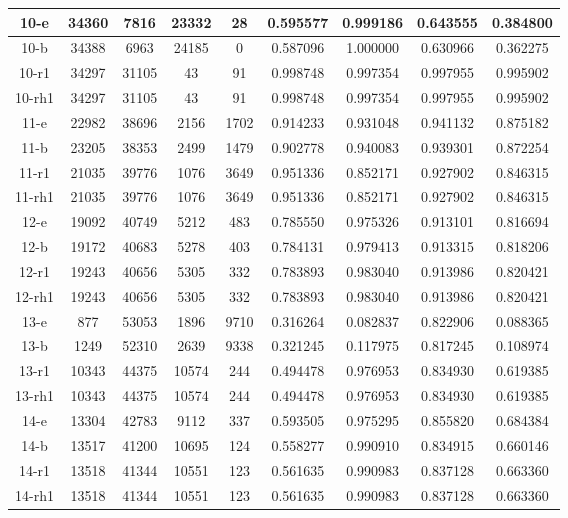 \begin{longtable}[!h]{|c|c|c|c|c|c|c|c|c|}
	\hline	10-e	&	34360	&	7816	&	23332	&	28	&	0.595577	&	0.999186	&	0.643555	&	0.384800	\\
	\hline \rowcolor{bad}	10-b	&	34388	&	6963	&	24185	&	0	&	0.587096	&	1.000000	&	0.630966	&	0.362275	\\
	\hline \rowcolor{closest}	10-r1	&	34297	&	31105	&	43	&	91	&	0.998748	&	0.997354	&	0.997955	&	0.995902	\\
	\hline \rowcolor{closest}	10-rh1	&	34297	&	31105	&	43	&	91	&	0.998748	&	0.997354	&	0.997955	&	0.995902	\\
	
	\hline \rowcolor{closest}	11-e	&	22982	&	38696	&	2156	&	1702	&	0.914233	&	0.931048	&	0.941132	&	0.875182	\\
	\hline	11-b	&	23205	&	38353	&	2499	&	1479	&	0.902778	&	0.940083	&	0.939301	&	0.872254	\\
	\hline \rowcolor{bad}	11-r1	&	21035	&	39776	&	1076	&	3649	&	0.951336	&	0.852171	&	0.927902	&	0.846315	\\
	\hline \rowcolor{bad}	11-rh1	&	21035	&	39776	&	1076	&	3649	&	0.951336	&	0.852171	&	0.927902	&	0.846315	\\
	
	\hline \rowcolor{bad}	12-e	&	19092	&	40749	&	5212	&	483	&	0.785550	&	0.975326	&	0.913101	&	0.816694	\\
	\hline	12-b	&	19172	&	40683	&	5278	&	403	&	0.784131	&	0.979413	&	0.913315	&	0.818206	\\
	\hline \rowcolor{closest}	12-r1	&	19243	&	40656	&	5305	&	332	&	0.783893	&	0.983040	&	0.913986	&	0.820421	\\
	\hline \rowcolor{closest}	12-rh1	&	19243	&	40656	&	5305	&	332	&	0.783893	&	0.983040	&	0.913986	&	0.820421	\\
	
	\hline \rowcolor{bad}	13-e	&	877	&	53053	&	1896	&	9710	&	0.316264	&	0.082837	&	0.822906	&	0.088365	\\
	\hline	13-b	&	1249	&	52310	&	2639	&	9338	&	0.321245	&	0.117975	&	0.817245	&	0.108974	\\
	\hline \rowcolor{closest}	13-r1	&	10343	&	44375	&	10574	&	244	&	0.494478	&	0.976953	&	0.834930	&	0.619385	\\
	\hline \rowcolor{closest}	13-rh1	&	10343	&	44375	&	10574	&	244	&	0.494478	&	0.976953	&	0.834930	&	0.619385	\\
	
	\hline \rowcolor{closest}	14-e	&	13304	&	42783	&	9112	&	337	&	0.593505	&	0.975295	&	0.855820	&	0.684384	\\
	\hline \rowcolor{bad}	14-b	&	13517	&	41200	&	10695	&	124	&	0.558277	&	0.990910	&	0.834915	&	0.660146	\\
	\hline	14-r1	&	13518	&	41344	&	10551	&	123	&	0.561635	&	0.990983	&	0.837128	&	0.663360	\\
	\hline	14-rh1	&	13518	&	41344	&	10551	&	123	&	0.561635	&	0.990983	&	0.837128	&	0.663360	\\
	

\end{longtable}
